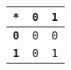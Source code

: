 \begin{tabular}{rrr}
\toprule
\textbf{\texttt{*}}& \textbf{\texttt{0}}& \textbf{\texttt{1}}\\ \midrule
\textbf{\texttt{0}} & \texttt{0} & \texttt{0}\\
\textbf{\texttt{1}} & \texttt{0} & \texttt{1}\\
\bottomrule
\end{tabular}
